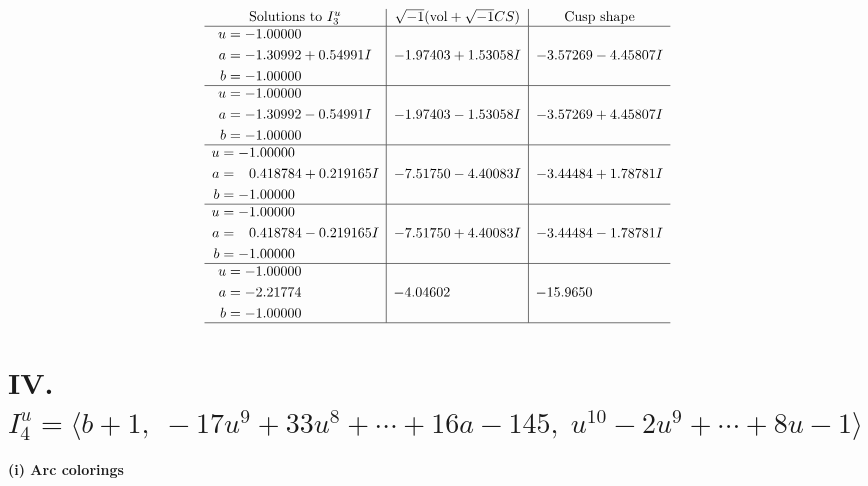 \documentclass[1p]{elsarticle_modified}
\theoremstyle{definition}
\newcommand{\I}{\sqrt{-1}}
\begin{document}
$$\begin{array}{c|c|c}  
\text{Solutions to }I^u_{3}& \I (\text{vol} + \sqrt{-1}CS) & \text{Cusp shape}\\
 \hline 
\begin{aligned}
u &= -1.00000\phantom{ +0.000000I} \\
a &= -1.30992 + 0.54991 I \\
b &= -1.00000\phantom{ +0.000000I}\end{aligned}
 & -1.97403 + 1.53058 I & -3.57269 - 4.45807 I \\ \hline\begin{aligned}
u &= -1.00000\phantom{ +0.000000I} \\
a &= -1.30992 - 0.54991 I \\
b &= -1.00000\phantom{ +0.000000I}\end{aligned}
 & -1.97403 - 1.53058 I & -3.57269 + 4.45807 I \\ \hline\begin{aligned}
u &= -1.00000\phantom{ +0.000000I} \\
a &= \phantom{-}0.418784 + 0.219165 I \\
b &= -1.00000\phantom{ +0.000000I}\end{aligned}
 & -7.51750 - 4.40083 I & -3.44484 + 1.78781 I \\ \hline\begin{aligned}
u &= -1.00000\phantom{ +0.000000I} \\
a &= \phantom{-}0.418784 - 0.219165 I \\
b &= -1.00000\phantom{ +0.000000I}\end{aligned}
 & -7.51750 + 4.40083 I & -3.44484 - 1.78781 I \\ \hline\begin{aligned}
u &= -1.00000\phantom{ +0.000000I} \\
a &= -2.21774\phantom{ +0.000000I} \\
b &= -1.00000\phantom{ +0.000000I}\end{aligned}
 & -4.04602\phantom{ +0.000000I} & -15.9650\phantom{ +0.000000I}\\
 \hline 
 \end{array}$$\newpage\newpage\renewcommand{\arraystretch}{1}
\centering \section*{IV. $I^u_{4}= \langle b+1,\;-17 u^9+33 u^8+\cdots+16 a-145,\;u^{10}-2 u^9+\cdots+8 u-1 \rangle$}
\flushleft \textbf{(i) Arc colorings}\\
\end{document}

